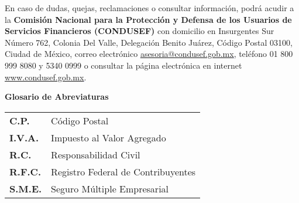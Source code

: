 \documentclass[letterpaper,10pt]{article}
\begin{document}
En caso de dudas, quejas, reclamaciones o consultar información, podrá acudir a la \textbf{Comisión Nacional para la Protección y Defensa de los Usuarios de Servicios Financieros (CONDUSEF)} con domicilio en Insurgentes Sur Número 762, Colonia Del Valle, Delegación Benito Juárez, Código Postal 03100, Ciudad de México, correo electrónico \textcolor{blue}{\underline{\href{asesoria@condusef.gob.mx}{asesoria@condusef.gob.mx}}}, teléfono 01 800 999 8080 y 5340 0999 o consultar la página electrónica en internet \textcolor{blue}{\underline{\href{www.condusef.gob.mx}{www.condusef.gob.mx}}}.\\

\vspace{4cm}

\noindent \textbf{Glosario de Abreviaturas}\\
\begin{center}
    \begin{tabularx}{\textwidth}{ll}
        \textbf{C.P.} & Código Postal\\
        \textbf{I.V.A.} & Impuesto al Valor Agregado\\
        \textbf{R.C.} & Responsabilidad Civil\\
        \textbf{R.F.C.} & Registro Federal de Contribuyentes\\
        \textbf{S.M.E.} & Seguro Múltiple Empresarial\\        
    \end{tabularx}
\end{center}
\end{document}
